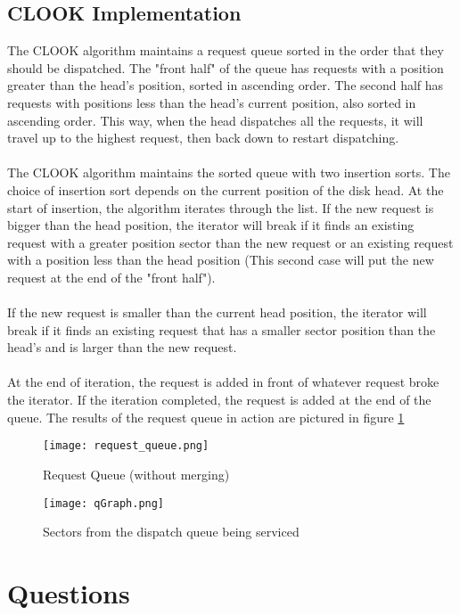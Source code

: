 \documentclass{article}
\begin{document}
    \subsection{CLOOK Implementation}
    The CLOOK algorithm maintains a request queue sorted in the order that they should be dispatched.  The "front half" of the queue has requests with a position greater than the head's position, sorted in ascending order.  The second half has requests with positions less than the head's current position, also sorted in ascending order.  This way, when the head dispatches all the requests, it will travel up to the highest request, then back down to restart dispatching.\\\\
    The CLOOK algorithm maintains the sorted queue with two insertion sorts.  The choice of insertion sort depends on the current position of the disk head.  At the start of insertion, the algorithm iterates through the list.
    If the new request is bigger than the head position, the iterator will break if it finds an existing request with a greater position sector than the new request or an existing request with a position less than the head position (This second case will put the new request at the end of the "front half").\\\\
    If the new request is smaller than the current head position, the iterator will break if it finds an existing request that has a smaller sector position than the head's and is larger than the new request.\\\\
    At the end of iteration, the request is added in front of whatever request broke the iterator.  If the iteration completed, the request is added at the end of the queue.
    The results of the request queue in action are pictured in figure \ref{fig:rq_q}


    \begin{figure}[h]
        \centering
        \texttt{[image: request\_queue.png]}
        \caption{Request Queue (without merging)}
        \label{fig:rq_q}
    \end{figure}

    \begin{figure}[h]
        \centering
        \texttt{[image: qGraph.png]}
        \caption{Sectors from the dispatch queue being serviced}
    \end{figure}

\section{Questions}
\end{document}
